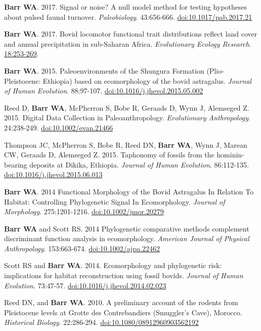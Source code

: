 \item  {\bfseries Barr WA}. 2017. Signal or noise? A null model method for testing hypotheses about pulsed faunal turnover. \emph{Paleobiology}. 43:656-666. \href{https://doi.org/10.1017/pab.2017.21}{doi:10.1017/pab.2017.21}

\item  {\bfseries Barr WA}. 2017. Bovid locomotor functional trait distributions reflect land cover and annual precipitation in sub-Saharan Africa. \emph{Evolutionary Ecology Research}.  \href{http://www.evolutionary-ecology.com/issues/v18/n03/ddar3051.pdf}{18:253-269}.

\item  {\bfseries Barr WA}. 2015. Paleoenvironments of the Shungura Formation (Plio-Pleistocene: Ethiopia) based on ecomorphology of the bovid astragalus. \emph{Journal of Human Evolution}. 88:97-107. \href{http://dx.doi.org/10.1016/j.jhevol.2015.05.002}{doi:10.1016/j.jhevol.2015.05.002}

\item  Reed D, {\bfseries Barr WA}, McPherron S, Bobe R, Geraads D, Wynn J, Alemseged Z. 2015. Digital Data Collection in Paleoanthropology. \emph{Evolutionary Anthropology}. 24:238-249. \href{http://dx.doi.org/10.1002/evan.21466}{doi:10.1002/evan.21466}

\item  Thompson JC, McPherron S, Bobe R, Reed DN, {\bfseries Barr WA}, Wynn J, Marean CW, Geraads D, Alemseged Z. 2015. Taphonomy of fossils from the hominin-bearing deposits at Dikika, Ethiopia. \emph{Journal of Human Evolution}. 86:112-135. \href{http://dx.doi.org/10.1016/j.jhevol.2015.06.013}{doi:10.1016/j.jhevol.2015.06.013}

\item  {\bfseries Barr WA}. 2014 Functional Morphology of the Bovid Astragalus In Relation To Habitat: Controlling Phylogenetic Signal In Ecomorphology. \emph{Journal of Morphology}. 275:1201-1216. \href{http://dx.doi.org/10.1002/jmor.20279}{doi:10.1002/jmor.20279}

\item  {\bfseries Barr WA} and Scott RS. 2014 Phylogenetic comparative methods complement discriminant function analysis in ecomorphology. \emph{American Journal of Physical Anthropology}. 153:663-674. \href{http://dx.doi.org/10.1002/ajpa.22462}{doi:10.1002/ajpa.22462}

\item  Scott RS and {\bfseries Barr WA}. 2014. Ecomorphology and phylogenetic risk: implications for habitat reconstruction using fossil bovids. \emph{Journal of Human Evolution}. 73:47-57. \href{http://dx.doi.org/10.1016/j.jhevol.2014.02.023}{doi:10.1016/j.jhevol.2014.02.023}

\item  Reed DN, and {\bfseries Barr WA}. 2010. A preliminary account of the rodents from Pleistocene levels at Grotte des Contrebandiers (Smuggler's Cave), Morocco. \emph{Historical Biology}. 22:286-294. \href{http://dx.doi.org/10.1080/08912960903562192}{doi:10.1080/08912960903562192}




